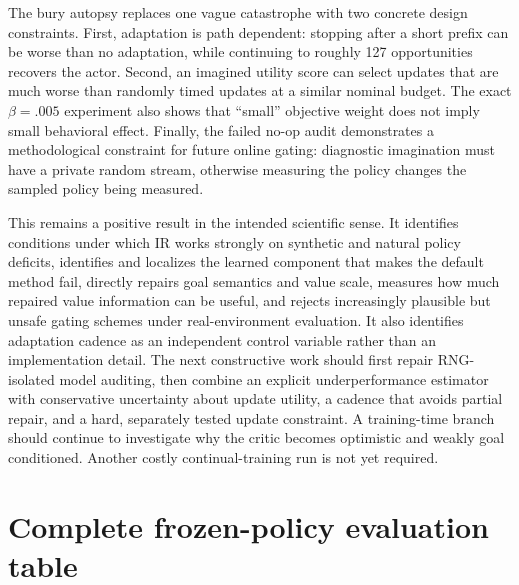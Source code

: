\documentclass[10pt]{article}
\begin{document}
The bury autopsy replaces one vague catastrophe with two concrete design
constraints. First, adaptation is path dependent: stopping after a short
prefix can be worse than no adaptation, while continuing to roughly 127
opportunities recovers the actor. Second, an imagined utility score can select
updates that are much worse than randomly timed updates at a similar nominal
budget. The exact $\beta=.005$ experiment also shows that ``small'' objective
weight does not imply small behavioral effect. Finally, the failed no-op audit
demonstrates a methodological constraint for future online gating: diagnostic
imagination must have a private random stream, otherwise measuring the policy
changes the sampled policy being measured.

This remains a positive result in the intended scientific sense. It identifies conditions under which IR works strongly on synthetic and natural policy deficits, identifies and localizes the learned component that makes the default method fail, directly repairs goal semantics and value scale, measures how much repaired value information can be useful, and rejects increasingly plausible but unsafe gating schemes under real-environment evaluation. It also identifies adaptation cadence as an independent control variable rather than an implementation detail. The next constructive work should first repair RNG-isolated model auditing, then combine an explicit underperformance estimator with conservative uncertainty about update utility, a cadence that avoids partial repair, and a hard, separately tested update constraint. A training-time branch should continue to investigate why the critic becomes optimistic and weakly goal conditioned. Another costly continual-training run is not yet required.

\clearpage
\appendix

\section{Complete frozen-policy evaluation table}
\end{document}
